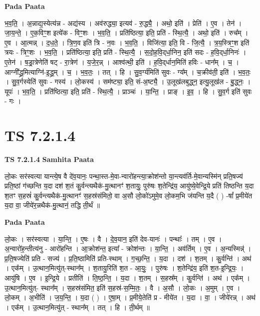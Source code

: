 \documentclass[17pt]{extarticle}
\begin{document}
\textbf{Pada Paata} \newline

भ॒व॒ति॒ । अ॒न्नाद्य॒स्येत्य॑न्न - अद्य॑स्य । अव॑रुद्ध्या॒ इत्यव॑ - रु॒द्ध्यै॒ । अथो॒ इति॑ । प्रेति॑ । ए॒व । तेन॑ । जा॒य॒न्ते॒ । ए॒क॒विꣳ॒॒श इत्ये॑क - विꣳ॒॒शः । भ॒व॒ति॒ । प्रति॑ष्ठित्या॒ इति॒ प्रति॑ - स्थि॒त्यै॒ । अथो॒ इति॑ । रुच᳚म् । ए॒व । आ॒त्मन्न् । द॒ध॒ते॒ । त्रि॒ण॒व इति॑ त्रि - न॒वः । भ॒व॒ति॒ । विजि॑त्या॒ इति॒ वि - जि॒त्यै॒ । त्र॒य॒स्त्रिꣳ॒॒श इति॑ त्रयः - त्रिꣳ॒॒शः । भ॒व॒ति॒ । प्रति॑ष्ठित्या॒ इति॒ प्रति॑ - स्थि॒त्यै॒ । स॒दो॒ह॒वि॒द्‌र्धा॒निन॒ इति॑ सदः - ह॒वि॒द्‌र्धा॒निनः॑ । ए॒तेन॑ । ष॒ड्रा॒त्रेणेति॑ षट् - रा॒त्रेण॑ । य॒जे॒र॒न्न् । आश्व॑त्थी॒ इति॑ । ह॒वि॒द्‌र्धान॒मिति॑ हविः - धान᳚म् । च॒ । आग्नी᳚द्ध्र॒मित्याग्नि॑-इ॒द्ध्र॒म् । च॒ । भ॒व॒तः॒ । तत् । हि । सु॒व॒र्ग्य॑मिति॑ सुवः - ग्य᳚म् । च॒क्रीव॑ती॒ इति॑ । भ॒व॒तः॒ । सु॒व॒र्गस्येति॑ सुवः - गस्य॑ । लो॒कस्य॑ । सम॑ष्ट्या॒ इति॒ सं-अ॒ष्ट्यै॒ । उ॒लूख॑लबुद्ध्न॒ इत्यु॒लूख॑ल - बु॒द्ध्नः॒ । यूपः॑ । भ॒व॒ति॒ । प्रति॑ष्ठित्या॒ इति॒ प्रति॑ - स्थि॒त्यै॒ । प्राञ्चः॑ । या॒न्ति॒ । प्राङ् । इ॒व॒ । हि । सु॒व॒र्ग इति॑ सुवः - गः ।  \newline





\section{ TS 7.2.1.4 }

\textbf{TS 7.2.1.4 } \newline
\textbf{Samhita Paata} \newline

लो॒कः सर॑स्वत्या यान्त्ये॒ष वै दे॑व॒यानः॒ पन्था॒स्त-मे॒वा-न्वारो॑हन्त्या॒क्रोश॑न्तो या॒न्त्यव॑र्ति-मे॒वान्यस्मि॑न् प्रति॒षज्य॑ प्रति॒ष्ठां ग॑च्छन्ति य॒दा दश॑ श॒तं कु॒र्वन्त्यथैक॑-मु॒त्थानꣳ॑ श॒तायुः॒ पुरु॑षः श॒तेन्द्रि॑य॒ आयु॑ष्ये॒वेन्द्रि॒ये प्रति॑ तिष्ठन्ति य॒दा श॒तꣳ स॒हस्रं॑ कु॒र्वन्त्यथैक॑-मु॒त्थानꣳ॑ स॒हस्र॑संमितो॒ वा अ॒सौ लो॒को॑ऽमुमे॒व लो॒कम॒भि ज॑यन्ति य॒दै ( ) -षां᳚ प्र॒मीये॑त य॒दा वा॒ जीये॑र॒न्नथैक॑-मु॒त्थानं॒ तद्धि ती॒र्थं ॥ \newline

\textbf{Pada Paata} \newline

लो॒कः । सर॑स्वत्या । या॒न्ति॒ । ए॒षः । वै । दे॒व॒यान॒ इति॑ देव-यानः॑ । पन्थाः᳚ । तम् । ए॒व । अ॒न्वारो॑ह॒न्तीत्य॑नु - आरो॑हन्ति । आ॒क्रोश॑न्त॒ इत्या᳚ - क्रोश॑न्तः । या॒न्ति॒ । अव॑र्तिम् । ए॒व । अ॒न्यस्मिन्न्॑ । प्र॒ति॒षज्येति॑ प्रति - सज्य॑ । प्र॒ति॒ष्ठामिति॑ प्रति-स्थाम् । ग॒च्छ॒न्ति॒ । य॒दा । दश॑ । श॒तम् । कु॒र्वन्ति॑ । अथ॑ । एक᳚म् । उ॒त्थान॒मित्यु॑त्-स्थान᳚म् । श॒तायु॒रिति॑ श॒त - आ॒युः॒ । पुरु॑षः । श॒तेन्द्रि॑य॒ इति॑ श॒त-इ॒न्द्रि॒यः॒ । आयु॑षि । ए॒व । इ॒न्द्रि॒ये । प्रतीति॑ । ति॒ष्ठ॒न्ति॒ । य॒दा । श॒तम् । स॒हस्र᳚म् । कु॒र्वन्ति॑ । अथ॑ । एक᳚म् । उ॒त्थान॒मित्यु॑त्- स्थान᳚म् । स॒हस्र॑संमित॒ इति॑ स॒हस्र॑-स॒म्मि॒तः॒ । वै । अ॒सौ । लो॒कः । अ॒मुम् । ए॒व । लो॒कम् । अ॒भीति॑ । ज॒य॒न्ति॒ । य॒दा ( ) । ए॒षा॒म् । प्र॒मीये॒तेति॑ प्र - मीये॑त । य॒दा । वा॒ । जीये॑रन्न् । अथ॑ । एक᳚म् । उ॒त्थान॒मित्यु॑त् - स्थान᳚म् । तत् । हि । ती॒र्थम् ॥  \newline
\end{document}
